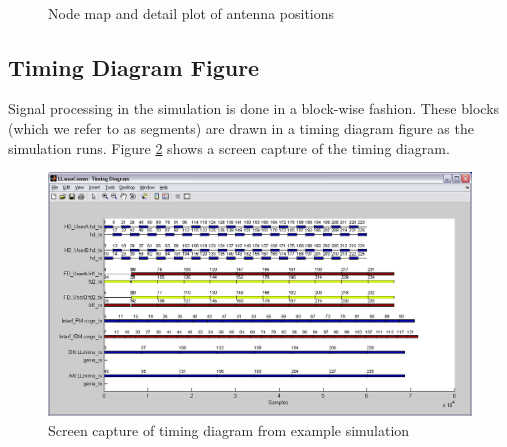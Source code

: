 \begin{figure}[h]
\centering \mbox{
     \quad
} \caption{Node map and detail plot of antenna positions}
\label{fig:nodeMap}
\end{figure}


\subsection{Timing Diagram Figure}\label{sec:tdSec}

Signal processing in the simulation is done in a block-wise fashion.
These blocks (which we refer to as segments) are drawn in a timing
diagram figure as the simulation runs.  Figure
\ref{fig:exTimingDiagram} shows a screen capture of the timing
diagram.

\begin{figure}[h]
\centering
\includegraphics[width=6in]{figs/Example_Timing_Diagram}
\caption{Screen capture of timing diagram from example simulation}
\label{fig:exTimingDiagram}
\end{figure}

